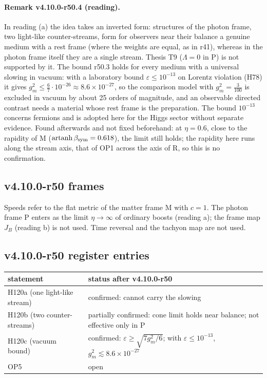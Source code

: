 \paragraph{Remark v4.10.0-r50.4 (reading).}
In reading (a) the idea takes an inverted form: structures of the photon frame, two light-like counter-streams, form for observers near their
balance a genuine medium with a rest frame (where the weights are equal, as in r41), whereas in the photon frame itself they are a single stream.
Thesis T9 (\(\Lambda=0\) in P) is not supported by it.  The bound r50.3 holds for every medium with a universal slowing in vacuum: with a laboratory bound
\(\varepsilon\le10^{-13}\) on Lorentz violation (H78) it gives \(g_m^2\le\tfrac67\cdot10^{-26}\approx8.6\times10^{-27}\), so the comparison model with \(g_m^2=\tfrac3{100}\) is excluded in vacuum by about
25 orders of magnitude, and an observable directed contrast needs a material whose rest frame is the preparation.  The bound \(10^{-13}\) concerns
fermions and is adopted here for the Higgs sector without separate evidence.  Found afterwards and not fixed beforehand: at \(\eta=0.6\), close to the
rapidity of M (\(\operatorname{artanh}\beta_{\rm sym}=0.618\)), the limit still holds; the rapidity here runs along the stream axis, that of OP1 across the axis of R,
so this is no confirmation.

\subsection*{v4.10.0-r50 frames}
\label{subsec:v4100-r50-frames}

Speeds refer to the flat metric of the matter frame M with \(c=1\).  The photon frame P enters as the limit \(\eta\to\infty\) of ordinary boosts (reading a); the
frame map \(J_B\) (reading b) is not used.  Time reversal and the tachyon map are not used.

\subsection*{v4.10.0-r50 register entries}
\label{subsec:v4100-r50-register}

\begin{center}
\small
\begin{tabular}{@{}>{\raggedright\arraybackslash}p{}>{\raggedright\arraybackslash}p{}@{}}
\toprule
statement & status after v4.10.0-r50\\
\midrule
H120a (one light-like stream) & confirmed: cannot carry the slowing\\
H120b (two counter-streams) & partially confirmed: cone limit holds near balance; not effective only in P\\
H120c (vacuum bound) & confirmed: \(\varepsilon\ge\sqrt{7g_m^2/6}\); with \(\varepsilon\le10^{-13}\), \(g_m^2\lesssim8.6\times10^{-27}\)\\
OP5 & open\\
\bottomrule
\end{tabular}
\end{center}


